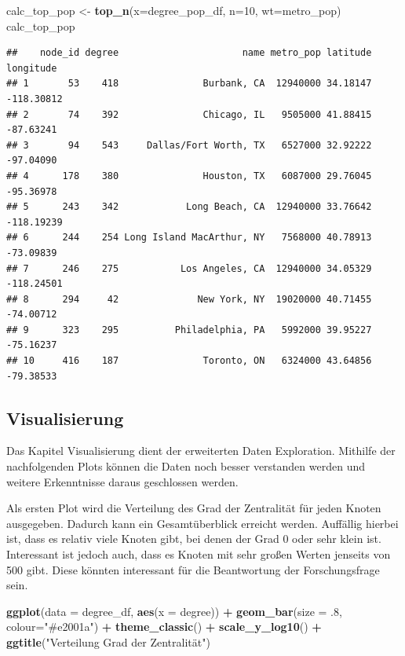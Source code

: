 \documentclass[]{article}
\newenvironment{Shaded}{\begin{snugshade}}{\end{snugshade}}
\newcommand{\DataTypeTok}[1]{\textcolor[rgb]{0.13,0.29,0.53}{#1}}
\newcommand{\DecValTok}[1]{\textcolor[rgb]{0.00,0.00,0.81}{#1}}
\newcommand{\FloatTok}[1]{\textcolor[rgb]{0.00,0.00,0.81}{#1}}
\newcommand{\KeywordTok}[1]{\textcolor[rgb]{0.13,0.29,0.53}{\textbf{#1}}}
\newcommand{\NormalTok}[1]{#1}
\newcommand{\OperatorTok}[1]{\textcolor[rgb]{0.81,0.36,0.00}{\textbf{#1}}}
\newcommand{\StringTok}[1]{\textcolor[rgb]{0.31,0.60,0.02}{#1}}
\begin{document}
\begin{Shaded}
\begin{Highlighting}[]
\NormalTok{calc_top_pop <-}\StringTok{ }\KeywordTok{top_n}\NormalTok{(}\DataTypeTok{x=}\NormalTok{degree_pop_df, }\DataTypeTok{n=}\DecValTok{10}\NormalTok{, }\DataTypeTok{wt=}\NormalTok{metro_pop)}
\NormalTok{calc_top_pop}
\end{Highlighting}
\end{Shaded}

\begin{verbatim}
##    node_id degree                      name metro_pop latitude  longitude
## 1       53    418               Burbank, CA  12940000 34.18147 -118.30812
## 2       74    392               Chicago, IL   9505000 41.88415  -87.63241
## 3       94    543     Dallas/Fort Worth, TX   6527000 32.92222  -97.04090
## 4      178    380               Houston, TX   6087000 29.76045  -95.36978
## 5      243    342            Long Beach, CA  12940000 33.76642 -118.19239
## 6      244    254 Long Island MacArthur, NY   7568000 40.78913  -73.09839
## 7      246    275           Los Angeles, CA  12940000 34.05329 -118.24501
## 8      294     42              New York, NY  19020000 40.71455  -74.00712
## 9      323    295          Philadelphia, PA   5992000 39.95227  -75.16237
## 10     416    187               Toronto, ON   6324000 43.64856  -79.38533
\end{verbatim}

\hypertarget{visualisierung}{%
\subsection{Visualisierung}\label{visualisierung}}

Das Kapitel Visualisierung dient der erweiterten Daten Exploration.
Mithilfe der nachfolgenden Plots können die Daten noch besser verstanden
werden und weitere Erkenntnisse daraus geschlossen werden.

Als ersten Plot wird die Verteilung des Grad der Zentralität für jeden
Knoten ausgegeben. Dadurch kann ein Gesamtüberblick erreicht werden.
Auffällig hierbei ist, dass es relativ viele Knoten gibt, bei denen der
Grad 0 oder sehr klein ist. Interessant ist jedoch auch, dass es Knoten
mit sehr großen Werten jenseits von 500 gibt. Diese könnten interessant
für die Beantwortung der Forschungsfrage sein.

\begin{Shaded}
\begin{Highlighting}[]
\KeywordTok{ggplot}\NormalTok{(}\DataTypeTok{data =}\NormalTok{ degree_df, }\KeywordTok{aes}\NormalTok{(}\DataTypeTok{x =}\NormalTok{ degree)) }\OperatorTok{+}
\StringTok{  }\KeywordTok{geom_bar}\NormalTok{(}\DataTypeTok{size =} \FloatTok{.8}\NormalTok{, }\DataTypeTok{colour=}\StringTok{"#e2001a"}\NormalTok{) }\OperatorTok{+}
\StringTok{  }\KeywordTok{theme_classic}\NormalTok{() }\OperatorTok{+}
\StringTok{  }\KeywordTok{scale_y_log10}\NormalTok{() }\OperatorTok{+}
\StringTok{  }\KeywordTok{ggtitle}\NormalTok{(}\StringTok{"Verteilung Grad der Zentralität"}\NormalTok{)}
\end{Highlighting}
\end{Shaded}
\end{document}
